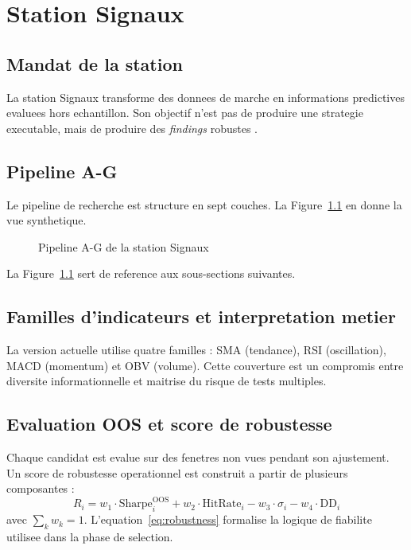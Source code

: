 \chapter{Station Signaux}

\section{Mandat de la station}
La station Signaux transforme des donnees de marche en informations
predictives evaluees hors echantillon. Son objectif n'est pas de produire une
strategie executable, mais de produire des \textit{findings} robustes
\cite{deprado2018}.

\section{Pipeline A-G}
Le pipeline de recherche est structure en sept couches.
La Figure~\ref{fig:signals-ag} en donne la vue synthetique.

\begin{figure}[H]
\centering
{}
\caption{Pipeline A-G de la station Signaux}
\label{fig:signals-ag}
\end{figure}

La Figure~\ref{fig:signals-ag} sert de reference aux sous-sections suivantes.

\section{Familles d'indicateurs et interpretation metier}
La version actuelle utilise quatre familles : SMA (tendance), RSI
(oscillation), MACD (momentum) et OBV (volume). Cette couverture est un compromis
entre diversite informationnelle et maitrise du risque de tests multiples.

\section{Evaluation OOS et score de robustesse}
Chaque candidat est evalue sur des fenetres non vues pendant son ajustement.
Un score de robustesse operationnel est construit a partir de plusieurs
composantes :
\begin{equation}
R_i = w_1 \cdot \text{Sharpe}_{i}^{\text{OOS}} + w_2 \cdot \text{HitRate}_{i}
- w_3 \cdot \sigma_i - w_4 \cdot \text{DD}_{i}
\label{eq:robustness}
\end{equation}
avec $\sum_k w_k = 1$.
L'equation~\ref{eq:robustness} formalise la logique de fiabilite utilisee dans
la phase de selection.

